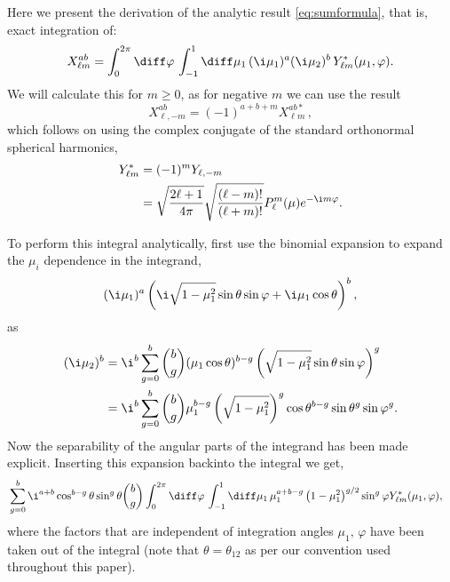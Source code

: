 

\iffalse

Here we present the derivation of the analytic result \ref{eq:sumformula}, that is, exact integration of:
\begin{equation} X_{\ell m}^{ab} = \int_0^{2\pi} \diff\varphi\, \int_{-1}^1 \diff\mu_1\, (\i \mu_1)^a (\i \mu_2)^b \,Y_{\ell m}^*(\mu_1,\varphi).
\end{equation}
We will calculate this for $m\geq0$, as for negative $m$ we can use the result
\begin{equation}
X_{\ell, -m}^{ab} = (-1)^{a+b+m} X_{\ell m}^{ab*}\,,
\end{equation}
which follows on using the complex conjugate of the standard orthonormal spherical harmonics,
\begin{align}
Y_{\ell m}^* &= (-1)^m Y_{\ell, -m} \nonumber\\
&= \sqrt{\frac{2 \ell + 1}{4 \pi}} \sqrt{\frac{(\ell - m )!}{(\ell + m )!}} P_\ell^m(\mu) e^{-\i m \varphi}.
\end{align}

To perform this integral analytically, first use the binomial expansion to expand the \(\mu_i\) dependence in the integrand, 
\begin{equation}
( \i \mu_1)^a \left(\i \sqrt{1-\mu_1^2} \sin\theta \sin\varphi + \i \mu_1 \cos\theta \right)^b,
\end{equation}
as
\begin{align}
(\i \mu_2)^b &= \i^b \sum_{g=0}^b \binom{b}{g} (\mu_1 \cos\theta)^{b-g} \left(\sqrt{1-\mu_1^2}\sin\theta \sin\varphi\right)^g \nonumber\\
& =\i^b \sum_{g=0}^b \binom{b}{g} \mu_1^{b-g} \left(\sqrt{1-\mu_1^2}\right)^g \cos\theta^{b-g} \sin\theta^g \sin\varphi^g. 
\end{align}
Now the separability of the angular parts of the integrand has been made explicit. Inserting this expansion backinto the integral we get, 
\begin{align}
&\sum_{g=0}^b \i^{a+b} \cos^{b-g}\theta \sin^g\theta \binom{b}{g} \int_0^{2\pi}\diff\varphi\, \int_{-1}^1 \diff\mu_1\, \mu_1^{a+b-g} \left(1-\mu_1^2\right)^{g/2} \sin^g\varphi Y_{\ell m}^*(\mu_1,\varphi),
\end{align}
where the factors that are independent of integration angles \(\mu_1,\,\varphi\) have been taken out of the integral (note that \(\theta = \theta_{12}\) as per our convention used throughout this paper). 

